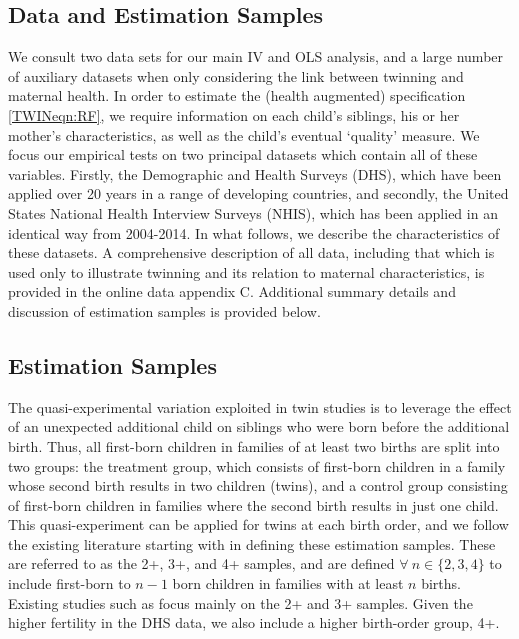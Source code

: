 \documentclass[subeqn]{article}
\begin{document}
\begin{spacing}{1.4}
\section{Data and Estimation Samples}              \label{TWINscn:data}
We consult two data sets for our main IV and OLS analysis, and a large number of
auxiliary datasets when only considering the link between twinning and maternal
health.  In order to estimate the (health augmented) specification 
\ref{TWINeqn:RF}, we require information on each child's siblings, his or her
mother's characteristics, as well as the child's eventual `quality' measure. 
We focus our empirical tests on two principal datasets which contain all of 
these variables.  Firstly, the Demographic and Health Surveys (DHS), which have 
been applied over 20 years in a range of developing countries, and secondly, the 
United States National Health Interview Surveys (NHIS), which has been applied 
in an identical way from 2004-2014.  In what follows, we describe the 
characteristics of these datasets.  A comprehensive description of all data, 
including that which is used only to illustrate twinning and its relation to 
maternal characteristics, is provided in the online data appendix C.  Additional
summary details and discussion of estimation samples is provided below.

\subsection{Estimation Samples}                    \label{TWINsscn:samples}
The quasi-experimental variation exploited in twin studies is to leverage the 
effect of an unexpected additional child on siblings who were born before the 
additional birth.  Thus, all first-born children in families of at least two
births are split into two groups: the treatment group, which consists of
first-born children in a family whose second birth results in two children
(twins), and a control group consisting of first-born children in families where
the second birth results in just one child.  This quasi-experiment can be
applied for twins at each birth order, and we follow the existing literature
starting with \citet{Blacketal2005} in defining these estimation samples. These
are referred to as the 2+, 3+, and 4+ samples, and are defined $\forall\ n \in
\{2, 3, 4\}$ to include first-born to $n-1$ born children in families with at
least $n$ births. Existing studies such as \citet{Angristetal2010} focus mainly
on the 2+ and 3+ samples. Given the higher fertility in the DHS data, we also
include a higher birth-order group, 4+.


\end{spacing}
\end{document}
